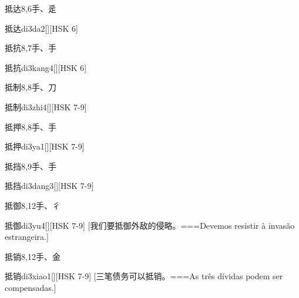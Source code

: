 \begin{Entry}{抵达}{8,6}{⼿、⾡}
  \begin{Phonetics}{抵达}{di3da2}[][HSK 6]
  \end{Phonetics}
\end{Entry}

\begin{Entry}{抵抗}{8,7}{⼿、⼿}
  \begin{Phonetics}{抵抗}{di3kang4}[][HSK 6]
  \end{Phonetics}
\end{Entry}

\begin{Entry}{抵制}{8,8}{⼿、⼑}
  \begin{Phonetics}{抵制}{di3zhi4}[][HSK 7-9]
  \end{Phonetics}
\end{Entry}

\begin{Entry}{抵押}{8,8}{⼿、⼿}
  \begin{Phonetics}{抵押}{di3ya1}[][HSK 7-9]
  \end{Phonetics}
\end{Entry}

\begin{Entry}{抵挡}{8,9}{⼿、⼿}
  \begin{Phonetics}{抵挡}{di3dang3}[][HSK 7-9]
  \end{Phonetics}
\end{Entry}

\begin{Entry}{抵御}{8,12}{⼿、⼻}
  \begin{Phonetics}{抵御}{di3yu4}[][HSK 7-9]
    [我们要抵御外敌的侵略。===Devemos resistir à invasão estrangeira.]
  \end{Phonetics}
\end{Entry}

\begin{Entry}{抵销}{8,12}{⼿、⾦}
  \begin{Phonetics}{抵销}{di3xiao1}[][HSK 7-9]
    [三笔债务可以抵销。===As três dívidas podem ser compensadas.]
  \end{Phonetics}
\end{Entry}


